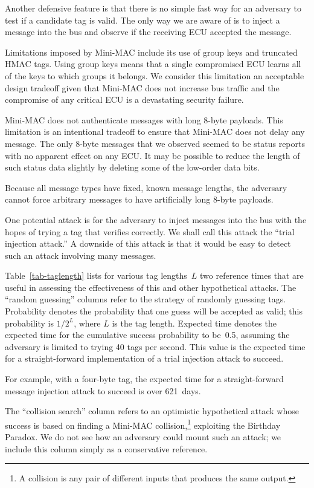 Another defensive feature is that there is no simple fast way for an adversary to
test if a candidate tag is valid.   The only way we are aware of is to inject a message into the bus
and observe if the receiving ECU accepted the message.

Limitations imposed by Mini-MAC include its use of group keys and truncated HMAC tags.  
Using group keys means that a single compromised ECU learns all of the keys
to which groups it belongs.  We consider this limitation an acceptable design tradeoff
given that Mini-MAC does not increase bus traffic and the compromise of any critical
ECU is a devastating security failure.

Mini-MAC does not authenticate messages with long 8-byte payloads.  This limitation is 
an intentional tradeoff to ensure that Mini-MAC does not delay any message. 
The only 8-byte messages that we observed seemed to be status reports
with no apparent effect on any ECU.  
It may be possible to reduce the length of such status data slightly 
by deleting some of the low-order data bits.

Because all message types have fixed, known message lengths, the adversary cannot 
force arbitrary messages to have artificially long 8-byte payloads.

One potential attack is for the adversary to inject messages into the bus with the hopes
of trying a tag that verifies correctly.  We shall call this attack the ``trial injection attack.''
A downside of this attack is that it would be easy to detect such an attack involving
many messages.

Table~\ref{tab-taglength} lists for various tag lengths~$L$
two reference times that are useful in assessing the effectiveness of this and other hypothetical attacks.
The ``random guessing'' columns refer to the strategy of randomly guessing tags.
Probability denotes the probability that one guess will be accepted as valid; this probability
is $1/2^{L}$, where $L$ is the tag length.
Expected time denotes the expected time for the cumulative success probability to be~0.5,
assuming the adversary is limited to trying 40 tags per second.
This value is the expected time for a straight-forward 
implementation of a trial injection attack to succeed.  

For example, with a four-byte tag, the expected time for a straight-forward 
message injection attack to succeed is over 621~days.  

The ``collision search'' column refers to an optimistic hypothetical attack whose success is based on
finding a Mini-MAC collision,\footnote{A collision is any pair of 
different inputs that produces the same output.}
exploiting the Birthday Paradox.  
We do not see how an adversary could mount such an attack;
we include this column simply as a conservative reference.

